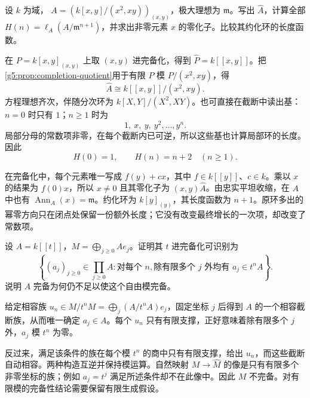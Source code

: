 \begin{exercise}\label{g5:ex:nilpotent-hilbert-samuel}
	设 \(k\) 为域，
	\(A=(k[x,y]/(x^2,xy))_{(x,y)}\)，极大理想为 \(\mathfrak m\)。写出 \(\widehat A\)，计算全部
	\(H(n)=\ell_A(A/\mathfrak m^{n+1})\)，并求出非零元素 \(x\) 的零化子。比较其约化环的长度函数。
\end{exercise}
\begin{solution}
	在 \(P=k[x,y]_{(x,y)}\) 上取 \((x,y)\) 进完备化，得到 \(\widehat P=k[[x,y]]\)。把\cref{g5:prop:completion-quotient}用于有限 \(P\) 模 \(P/(x^2,xy)\)，得
	\[
		\widehat A\cong k[[x,y]]/(x^2,xy).
	\]
	方程理想齐次，伴随分次环为 \(k[X,Y]/(X^2,XY)\)。也可直接在截断中读出基：\(n=0\) 时只有 \(1\)；\(n\geq1\) 时为
	\[
		1,\ x,\ y,\ y^2,\ldots,y^n.
	\]
	局部分母的常数项非零，在每个截断内已可逆，所以这些基也计算局部环的长度。因此
	\[
		H(0)=1,\qquad H(n)=n+2\quad(n\geq1).
	\]

	在完备化中，每个元素唯一写成 \(f(y)+cx\)，其中 \(f\in k[[y]]\)、\(c\in k\)。乘以 \(x\) 的结果为 \(f(0)x\)，所以 \(x\ne0\) 且其零化子为 \((x,y)\widehat A\)。由忠实平坦收缩，在 \(A\) 中也有 \(\operatorname{Ann}_A(x)=\mathfrak m\)。约化环为 \(k[y]_{(y)}\)，其长度函数为 \(n+1\)。原环多出的幂零方向只在闭点处保留一份额外长度；它没有改变最终增长的一次项，却改变了常数项。
\end{solution}

\begin{exercise}\label{g5:ex:restricted-product-completion}
	设 \(A=k[[t]]\)，\(M=\bigoplus_{j\geq0}Ae_j\)。证明其 \(t\) 进完备化可识别为
	\[
		\left\{(a_j)_{j\geq0}\in\prod_{j\geq0}A:
		\text{对每个 }n,\text{除有限多个 }j\text{ 外均有 }a_j\in t^nA\right\}.
	\]
	说明 \(A\) 完备为何仍不足以使这个自由模完备。
\end{exercise}
\begin{solution}
	给定相容族 \(u_n\in M/t^nM=\bigoplus_j(A/t^nA)e_j\)，固定坐标 \(j\) 后得到 \(A\) 的一个相容截断族，从而唯一确定 \(a_j\in A\)。每个 \(u_n\) 只有有限支撑，正好意味着除有限多个 \(j\) 外，\(a_j\) 模 \(t^n\) 为零。

	反过来，满足该条件的族在每个模 \(t^n\) 的商中只有有限支撑，给出 \(u_n\)，而这些截断自动相容。两种构造互逆并保持模运算。自然映射 \(M\to\widehat M\) 的像是只有有限多个非零坐标的族；例如 \(a_j=t^j\) 满足所述条件却不在此像中。因此 \(M\) 不完备。对有限模的完备性结论需要保留有限生成假设。
\end{solution}


